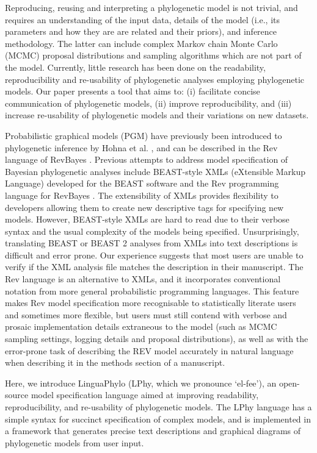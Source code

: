 \documentclass[10pt,letterpaper,table]{article}
\theoremstyle{definition}
\begin{document}
Reproducing, reusing and interpreting a phylogenetic model is not trivial, and requires an understanding of the input data, details of the model (i.e., its parameters and how they are are related and their priors), and inference methodology. 
The latter can include complex Markov chain Monte Carlo (MCMC) proposal distributions and sampling algorithms which are not part of the model.
Currently, little research has been done on the readability, reproducibility and re-usability of phylogenetic analyses employing phylogenetic models. 
Our paper presents a tool that aims to: (i) facilitate concise communication of phylogenetic models, (ii) improve reproducibility, and (iii) increase re-usability of phylogenetic models and their variations on new datasets. 

Probabilistic graphical models (PGM) have previously been introduced to phylogenetic inference by Hohna et al. \cite{revbayes}, and can be described in the Rev language of RevBayes \cite{revbayes}. 
Previous attempts to address model specification of Bayesian phylogenetic analyses include BEAST-style XMLs (eXtensible Markup Language) developed for the BEAST software \cite{beast,beast2} and the Rev programming language for RevBayes \cite{revbayes}. 
The extensibility of XMLs provides flexibility to developers allowing them to create new descriptive tags for specifying new models.
However, BEAST-style XMLs are hard to read due to their verbose syntax and the usual complexity of the models being specified. 
Unsurprisingly, translating BEAST or BEAST 2 analyses from XMLs into text descriptions is difficult and error prone. Our experience suggests that most users are unable to verify if the XML analysis file matches the description in their manuscript.
The Rev language \cite{revbayes} is an alternative to XMLs, and it incorporates conventional notation from more general probabilistic programming languages. 
This feature makes Rev model specification more recognisable to statistically literate users and sometimes more flexible, but users must still contend with verbose and prosaic implementation 
details extraneous to the model
(such as MCMC sampling settings, logging details and proposal distributions), as well as with the error-prone task of describing the REV model accurately in natural language when describing it in the methods section of a manuscript. 
 
Here, we introduce LinguaPhylo (LPhy, which we pronounce `el-fee'), an open-source model specification 
language aimed at improving readability, reproducibility, and re-usability of phylogenetic models. 
The LPhy language has a simple syntax for succinct specification of complex models, and is implemented in a framework that generates precise text descriptions and graphical diagrams of phylogenetic models from user input.
\end{document}
